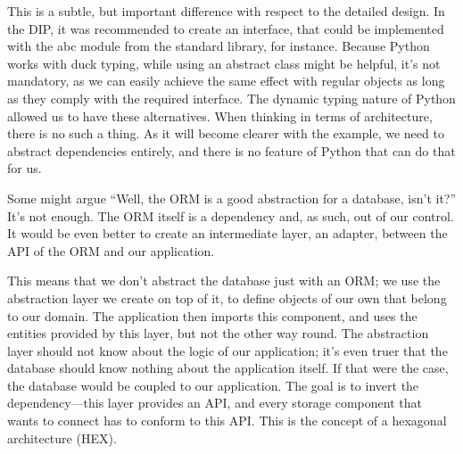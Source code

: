 \documentclass[a4paper,10pt,english]{sphinxmanual}
\begin{document}
This is a subtle, but important difference with respect to the detailed design. In the DIP, it
was recommended to create an interface, that could be implemented with the abc module
from the standard library, for instance. Because Python works with duck typing, while
using an abstract class might be helpful, it’s not mandatory, as we can easily achieve the
same effect with regular objects as long as they comply with the required interface. The
dynamic typing nature of Python allowed us to have these alternatives. When thinking in
terms of architecture, there is no such a thing. As it will become clearer with the example,
we need to abstract dependencies entirely, and there is no feature of Python that can do
that for us.

Some might argue “Well, the ORM is a good abstraction for a database, isn’t it?” It’s not
enough. The ORM itself is a dependency and, as such, out of our control. It would be even
better to create an intermediate layer, an adapter, between the API of the ORM and our
application.

This means that we don’t abstract the database just with an ORM; we use the abstraction
layer we create on top of it, to define objects of our own that belong to our domain.
The application then imports this component, and uses the entities provided by this layer,
but not the other way round. The abstraction layer should not know about the logic of our
application; it’s even truer that the database should know nothing about the application
itself. If that were the case, the database would be coupled to our application. The goal is to
invert the dependency—this layer provides an API, and every storage component that
wants to connect has to conform to this API. This is the concept of a hexagonal architecture
(HEX).
\end{document}
